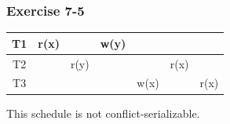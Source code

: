 \begin{frame}
\frametitle{Exercise 7-5}

\begin{center}
\begin{tabular}{ c c c c c c c }
  \hline
  T1 & r(x) & & w(y) & & & \\
  \hline
  T2 & & r(y) & & & r(x) & \\
  \hline
  T3 & & & & w(x) & & r(x) \\
  \hline
\end{tabular}
\end{center}

This schedule is not conflict-serializable.

\end{frame}

